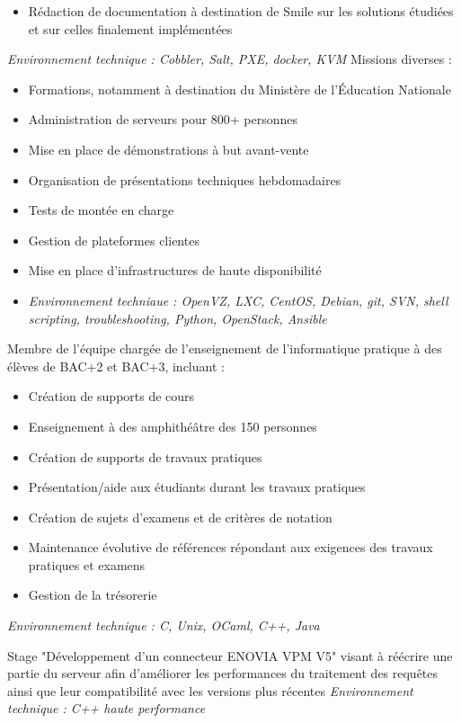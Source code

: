 \documentclass[10pt,a4paper]{../lib/moderncv/moderncv}
\begin{document}
{\begin{itemize}
    \item Rédaction de documentation à destination de Smile sur les solutions
      étudiées et sur celles finalement implémentées
  \end{itemize}
  \emph{Environnement technique : Cobbler, Salt, PXE, docker, KVM}
  \newline Missions diverses :
  \begin{itemize}
    \item Formations, notamment à destination du Ministère de l'Éducation
      Nationale
    \item Administration de serveurs pour 800+ personnes
    \item Mise en place de démonstrations à but avant-vente
    \item Organisation de présentations techniques hebdomadaires
    \item Tests de montée en charge
    \item Gestion de plateformes clientes
    \item Mise en place d'infrastructures de haute disponibilité
    \item \emph{Environnement techniaue : OpenVZ, LXC, CentOS, Debian, git,
      SVN, shell scripting, troubleshooting, Python, OpenStack, Ansible}
  \end{itemize}
}

{Membre de l'équipe chargée de l'enseignement de l'informatique pratique à des
élèves de BAC+2 et BAC+3, incluant :
\begin{itemize}
\item Création de supports de cours
\item Enseignement à des amphithéâtre des 150 personnes
\item Création de supports de travaux pratiques
\item Présentation/aide aux étudiants durant les travaux pratiques
\item Création de sujets d'examens et de critères de notation
\item Maintenance évolutive de références répondant aux exigences des travaux
pratiques et examens
\item Gestion de la trésorerie
\end{itemize}
\emph{Environnement technique : C, Unix, OCaml, C++, Java}}

{Stage "Développement d'un connecteur ENOVIA VPM V5" visant à réécrire une
partie du serveur afin d'améliorer les performances du traitement des requêtes
ainsi que leur compatibilité avec les versions plus récentes
\newline\emph{Environnement technique : C++ haute performance}}
\end{document}
